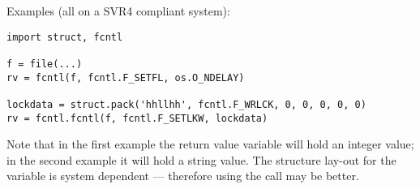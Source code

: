 Examples (all on a SVR4 compliant system):

\begin{verbatim}
import struct, fcntl

f = file(...)
rv = fcntl(f, fcntl.F_SETFL, os.O_NDELAY)

lockdata = struct.pack('hhllhh', fcntl.F_WRLCK, 0, 0, 0, 0, 0)
rv = fcntl.fcntl(f, fcntl.F_SETLKW, lockdata)
\end{verbatim}

Note that in the first example the return value variable  will
hold an integer value; in the second example it will hold a string
value.  The structure lay-out for the  variable is
system dependent --- therefore using the  call may be
better.

\begin{seealso}
\end{seealso}
